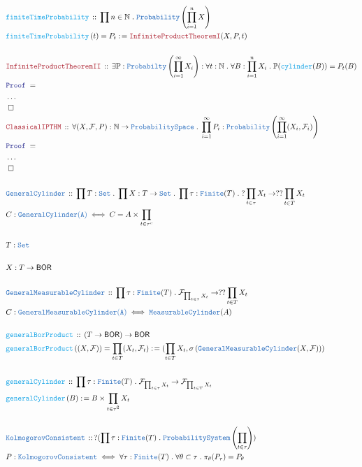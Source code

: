 \documentclass[12pt]{scrartcl}
\newcommand{\TYPE}[1]{\textcolor{NavyBlue}{\mathtt{#1}}}
\newcommand{\FUNC}[1]{\textcolor{Cerulean}{\mathtt{#1}}}
\newcommand{\LOGIC}[1]{\textcolor{Blue}{\mathtt{#1}}}
\newcommand{\THM}[1]{\textcolor{Maroon}{\mathtt{#1}}}
\renewcommand{\.}{\; . \;}
\newcommand{\de}{: \kern 0.1pc =}
\newcommand{\Act}[1]{\left( #1 \right)}
\newcommand{\Theorem}[2]{& \THM{#1} \, :: \, #2 \\ & \Proof = \\ }
\newcommand{\DeclareType}[2]{& \TYPE{#1} \, :: \, #2 \\}
\newcommand{\DefineType}[3]{& #1 : \TYPE{#2} \iff #3 \\}
\newcommand{\DeclareFunc}[2]{& \FUNC{#1} \, :: \, #2 \\}
\newcommand{\DefineFunc}[3]{&  \FUNC{#1}\Act{#2} \de #3 \\}
\newcommand{\DefineNamedFunc}[4]{&  \FUNC{#1}\Act{#2} = #3 \de #4 \\}
\newcommand{\Page}[1]{ \begin{align*} #1 \end{align*}   }
\newcommand{\ForEach}[3]{\forall #1 : #2 \. #3 }
\newcommand{\Nat}{\mathbb{N} }
\newcommand{\Set}{\TYPE{Set}}
\renewcommand{\c}{\complement}
\newcommand{\QED}{\; \square}
\newcommand{\EndProof}{& \QED \\}
\newcommand{\Proof}{\LOGIC{Proof} \; }
\newcommand{\BOR}{\mathsf{BOR}}
\newcommand{\F}{\mathcal{F}}
\begin{document}
\Page{
\DeclareFunc{finiteTimeProbability}{ \prod n \in \Nat \. \TYPE{Probability}\left ( \prod^n_{i = 1} X  \right )  }
\DefineNamedFunc{finiteTimeProbability}{ t  }{ P_t }{ \THM{InfiniteProductTheoremI}(X, P, t )  }
\\
\Theorem{InfiniteProductTheoremII}{
\exists \mathbb{P} : \TYPE{Probabilty}\left(  \prod^\infty_{i = 1} X_i  \right) : 
\ForEach{ t }{ \Nat }{ \ForEach{ B }{ \prod^n_{i = 1} X_i  }{
 \mathbb{P}( \FUNC{cylinder}(B)  ) =  P_t(B)   
} } } 
& \ldots \\
\EndProof 
\Theorem{ClassicalIPTHM}{
\ForEach{ (X,\F,P) }{ \Nat \to \TYPE{ProbabilitySpace}  }
{ \prod^\infty_{i = 1} P_i : \TYPE{Probability}\left(  \prod^\infty_{i = 1} (X_i,\F_i) \right)  
}}
& \ldots \\
\EndProof
\\
\DeclareType{GeneralCylinder}{   \prod T : \Set \.\prod X : T \to \Set \. \prod \tau : \TYPE{Finite}(T) \. ?\prod_{t \in \tau } X_t \to ??\prod_{t \in T} X_t }
\DefineType{C}{\TYPE{GeneralCylinder}(A)}{  C = A \times \prod_{t \in \tau^c} }    
\\
& T : \Set \\
\\
& X : T \to \BOR \\
\\
\DeclareType{GeneralMeasurableCylinder}{  \prod \tau : \TYPE{Finite}(T) \. \F_{\prod_{t \in \tau} X_t} \to ??\prod_{t \in T} X_t }
\DefineType{C}{ \TYPE{GeneralMeasurableCylinder}(A)}{ \TYPE{MeasurableCylinder}(A)  }
\\
\DeclareFunc{generalBorProduct}{  (T \to  \BOR ) \to \BOR    }
\DefineNamedFunc{generalBorProduct}{ (X, \F) }{ \prod_{t \in T} (X_t, \F_t)  }{  ( \prod_{t \in T} X_t, \sigma \left( \TYPE{GeneralMeasurableCylinder}(X, \F) \right)   )  }
\\
\DeclareFunc{generalCylinder}{ \prod \tau : \TYPE{Finite}(T) \. \F_{\prod_{t \in \tau} X_t } \to \F_{\prod_{t \in T} X_t }}
\DefineFunc{generalCylinder}{ B  }{ B \times \prod_{t \in \tau^\c} X_t}
\\
\DeclareType{KolmogorovConsistent}{ ?( \prod \tau : \TYPE{Finite}(T) \. \TYPE{ProbabilitySystem}\left( \prod_{t \in \tau}  \right) )  }
\DefineType{ P }{KolmogorovConsistent}{ \forall \tau : \TYPE{Finite}(T) \. \forall \theta \subset \tau \. \pi_\theta( P_\tau) = P_\theta  }
}
\newpage
\end{document}
